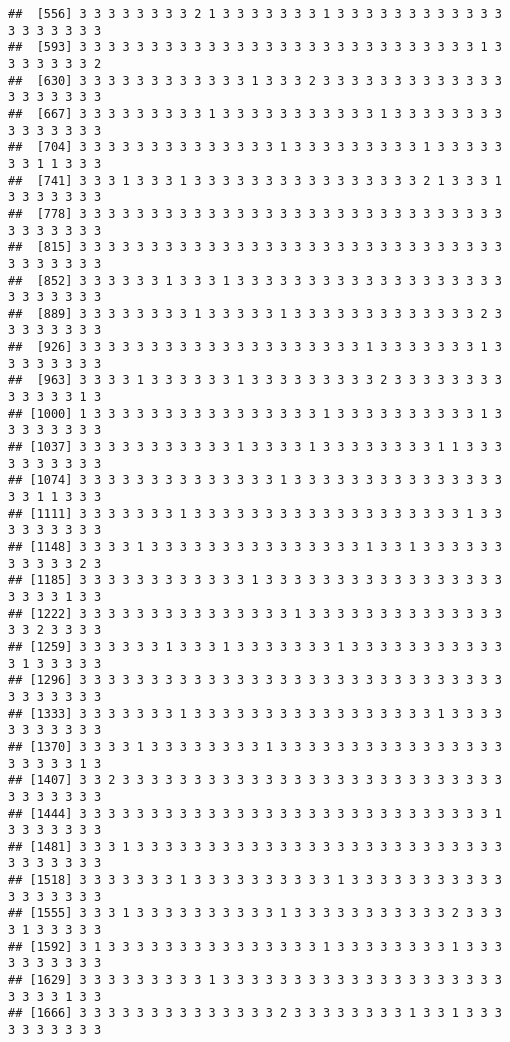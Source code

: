 \documentclass[
]{article}
\begin{document}
\begin{verbatim}
##  [556] 3 3 3 3 3 3 3 3 2 1 3 3 3 3 3 3 3 1 3 3 3 3 3 3 3 3 3 3 3 3 3 3 3 3 3 3 3
##  [593] 3 3 3 3 3 3 3 3 3 3 3 3 3 3 3 3 3 3 3 3 3 3 3 3 3 3 3 3 1 3 3 3 3 3 3 3 2
##  [630] 3 3 3 3 3 3 3 3 3 3 3 3 1 3 3 3 2 3 3 3 3 3 3 3 3 3 3 3 3 3 3 3 3 3 3 3 3
##  [667] 3 3 3 3 3 3 3 3 3 1 3 3 3 3 3 3 3 3 3 3 3 1 3 3 3 3 3 3 3 3 3 3 3 3 3 3 3
##  [704] 3 3 3 3 3 3 3 3 3 3 3 3 3 3 1 3 3 3 3 3 3 3 3 3 1 3 3 3 3 3 3 3 1 1 3 3 3
##  [741] 3 3 3 1 3 3 3 1 3 3 3 3 3 3 3 3 3 3 3 3 3 3 3 3 2 1 3 3 3 1 3 3 3 3 3 3 3
##  [778] 3 3 3 3 3 3 3 3 3 3 3 3 3 3 3 3 3 3 3 3 3 3 3 3 3 3 3 3 3 3 3 3 3 3 3 3 3
##  [815] 3 3 3 3 3 3 3 3 3 3 3 3 3 3 3 3 3 3 3 3 3 3 3 3 3 3 3 3 3 3 3 3 3 3 3 3 3
##  [852] 3 3 3 3 3 3 1 3 3 3 1 3 3 3 3 3 3 3 3 3 3 3 3 3 3 3 3 3 3 3 3 3 3 3 3 3 3
##  [889] 3 3 3 3 3 3 3 3 1 3 3 3 3 3 1 3 3 3 3 3 3 3 3 3 3 3 3 3 2 3 3 3 3 3 3 3 3
##  [926] 3 3 3 3 3 3 3 3 3 3 3 3 3 3 3 3 3 3 3 3 1 3 3 3 3 3 3 3 1 3 3 3 3 3 3 3 3
##  [963] 3 3 3 3 1 3 3 3 3 3 3 1 3 3 3 3 3 3 3 3 3 2 3 3 3 3 3 3 3 3 3 3 3 3 3 1 3
## [1000] 1 3 3 3 3 3 3 3 3 3 3 3 3 3 3 3 3 1 3 3 3 3 3 3 3 3 3 3 1 3 3 3 3 3 3 3 3
## [1037] 3 3 3 3 3 3 3 3 3 3 3 1 3 3 3 3 1 3 3 3 3 3 3 3 3 1 1 3 3 3 3 3 3 3 3 3 3
## [1074] 3 3 3 3 3 3 3 3 3 3 3 3 3 3 1 3 3 3 3 3 3 3 3 3 3 3 3 3 3 3 3 3 1 1 3 3 3
## [1111] 3 3 3 3 3 3 3 1 3 3 3 3 3 3 3 3 3 3 3 3 3 3 3 3 3 3 3 1 3 3 3 3 3 3 3 3 3
## [1148] 3 3 3 3 1 3 3 3 3 3 3 3 3 3 3 3 3 3 3 3 1 3 3 1 3 3 3 3 3 3 3 3 3 3 3 2 3
## [1185] 3 3 3 3 3 3 3 3 3 3 3 3 1 3 3 3 3 3 3 3 3 3 3 3 3 3 3 3 3 3 3 3 3 3 1 3 3
## [1222] 3 3 3 3 3 3 3 3 3 3 3 3 3 3 3 1 3 3 3 3 3 3 3 3 3 3 3 3 3 3 3 3 2 3 3 3 3
## [1259] 3 3 3 3 3 3 1 3 3 3 1 3 3 3 3 3 3 3 1 3 3 3 3 3 3 3 3 3 3 3 3 1 3 3 3 3 3
## [1296] 3 3 3 3 3 3 3 3 3 3 3 3 3 3 3 3 3 3 3 3 3 3 3 3 3 3 3 3 3 3 3 3 3 3 3 3 3
## [1333] 3 3 3 3 3 3 3 1 3 3 3 3 3 3 3 3 3 3 3 3 3 3 3 3 3 1 3 3 3 3 3 3 3 3 3 3 3
## [1370] 3 3 3 3 1 3 3 3 3 3 3 3 3 1 3 3 3 3 3 3 3 3 3 3 3 3 3 3 3 3 3 3 3 3 3 1 3
## [1407] 3 3 2 3 3 3 3 3 3 3 3 3 3 3 3 3 3 3 3 3 3 3 3 3 3 3 3 3 3 3 3 3 3 3 3 3 3
## [1444] 3 3 3 3 3 3 3 3 3 3 3 3 3 3 3 3 3 3 3 3 3 3 3 3 3 3 3 3 3 1 3 3 3 3 3 3 3
## [1481] 3 3 3 1 3 3 3 3 3 3 3 3 3 3 3 3 3 3 3 3 3 3 3 3 3 3 3 3 3 3 3 3 3 3 3 3 3
## [1518] 3 3 3 3 3 3 3 1 3 3 3 3 3 3 3 3 3 3 1 3 3 3 3 3 3 3 3 3 3 3 3 3 3 3 3 3 3
## [1555] 3 3 3 1 3 3 3 3 3 3 3 3 3 3 1 3 3 3 3 3 3 3 3 3 3 3 2 3 3 3 3 1 3 3 3 3 3
## [1592] 3 1 3 3 3 3 3 3 3 3 3 3 3 3 3 3 3 1 3 3 3 3 3 3 3 3 1 3 3 3 3 3 3 3 3 3 3
## [1629] 3 3 3 3 3 3 3 3 3 1 3 3 3 3 3 3 3 3 3 3 3 3 3 3 3 3 3 3 3 3 3 3 3 3 1 3 3
## [1666] 3 3 3 3 3 3 3 3 3 3 3 3 3 3 2 3 3 3 3 3 3 3 3 1 3 3 1 3 3 3 3 3 3 3 3 3 3

\end{verbatim}
\end{document}
